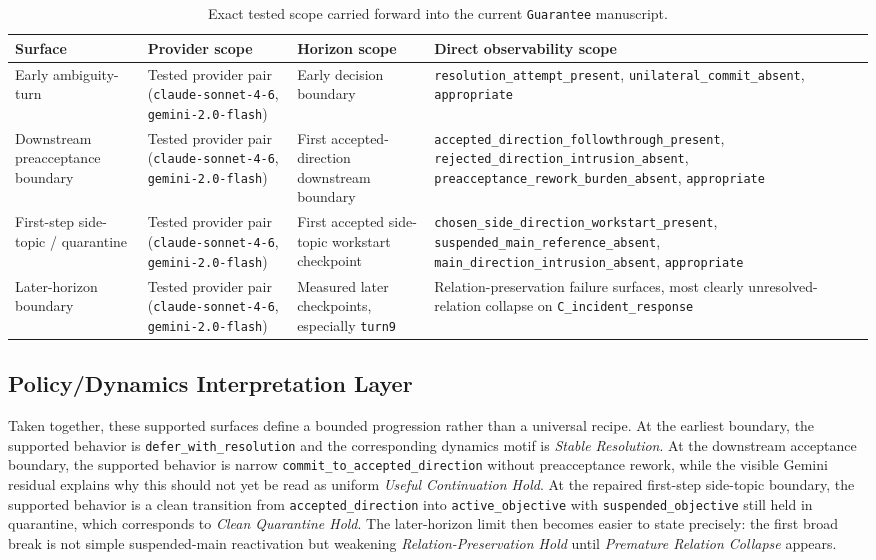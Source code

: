 \documentclass[11pt]{article}
\begin{document}
\begin{table}[ht]
\centering
\begin{tabular}{|p{}|p{}|p{}|p{}|}
\hline
\textbf{Surface} & \textbf{Provider scope} & \textbf{Horizon scope} & \textbf{Direct observability scope} \\
\hline
Early ambiguity-turn & Tested provider pair (\texttt{claude-sonnet-4-6}, \texttt{gemini-2.0-flash}) & Early decision boundary & \texttt{resolution\_attempt\_present}, \texttt{unilateral\_commit\_absent}, \texttt{appropriate} \\
\hline
Downstream preacceptance boundary & Tested provider pair (\texttt{claude-sonnet-4-6}, \texttt{gemini-2.0-flash}) & First accepted-direction downstream boundary & \texttt{accepted\_direction\_followthrough\_present}, \texttt{rejected\_direction\_intrusion\_absent}, \texttt{preacceptance\_rework\_burden\_absent}, \texttt{appropriate} \\
\hline
First-step side-topic / quarantine & Tested provider pair (\texttt{claude-sonnet-4-6}, \texttt{gemini-2.0-flash}) & First accepted side-topic workstart checkpoint & \texttt{chosen\_side\_direction\_workstart\_present}, \texttt{suspended\_main\_reference\_absent}, \texttt{main\_direction\_intrusion\_absent}, \texttt{appropriate} \\
\hline
Later-horizon boundary & Tested provider pair (\texttt{claude-sonnet-4-6}, \texttt{gemini-2.0-flash}) & Measured later checkpoints, especially \texttt{turn9} & Relation-preservation failure surfaces, most clearly unresolved-relation collapse on \texttt{C\_incident\_response} \\
\hline
\end{tabular}
\caption{Exact tested scope carried forward into the current \texttt{Guarantee}
manuscript.}
\end{table}

\subsection{Policy/Dynamics Interpretation Layer}

Taken together, these supported surfaces define a bounded progression rather than
a universal recipe. At the earliest boundary, the supported behavior is
\texttt{defer\_with\_resolution} and the corresponding dynamics motif is
\textit{Stable Resolution}. At the downstream acceptance boundary, the supported
behavior is narrow \texttt{commit\_to\_accepted\_direction} without preacceptance
rework, while the visible Gemini residual explains why this should not yet be
read as uniform \textit{Useful Continuation Hold}. At the repaired first-step
side-topic boundary, the supported behavior is a clean transition from
\texttt{accepted\_direction} into \texttt{active\_objective} with
\texttt{suspended\_objective} still held in quarantine, which corresponds to
\textit{Clean Quarantine Hold}. The later-horizon limit then becomes easier to
state precisely: the first broad break is not simple suspended-main reactivation
but weakening \textit{Relation-Preservation Hold} until \textit{Premature
Relation Collapse} appears.
\end{document}
